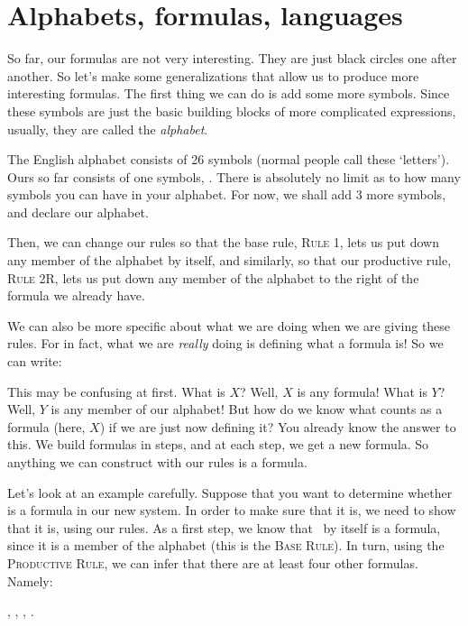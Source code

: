 \section{Alphabets, formulas, languages}

So far, our formulas are not very interesting. They are just black circles one after another. So let's make some generalizations that allow us to produce more interesting formulas. The first thing we can do is add some more symbols. Since these symbols are just the basic building blocks of more complicated expressions, usually, they are called the \textit{alphabet}. 

The English alphabet consists of 26 symbols (normal people call these `letters'). Ours so far consists of one symbols, \bcirc. There is absolutely no limit as to how many symbols you can have in your alphabet. For now, we shall add 3 more symbols, and declare our alphabet.


Then, we can change our rules so that the base rule, \textsc{Rule 1}, lets us put down any member of the alphabet by itself, and similarly, so that our productive rule, \textsc{Rule 2R}, lets us put down any member of the alphabet to the right of the formula we already have. 

We can also be more specific about what we are doing when we are giving these rules. For in fact, what we are \textit{really} doing is defining what a formula is! So we can write:



This may be confusing at first. What is $X$? Well, $X$ is any formula! What is $Y$? Well, $Y$ is any member of our alphabet! But how do we know what counts as a formula (here, $X$) if we are just now defining it? You already know the answer to this. We build formulas in steps, and at each step, we get a new formula. So anything we can construct with our rules is a formula. 

Let's look at an example carefully. Suppose that you want to determine whether \bbox\bcirc\bbox\btri{} is a formula in our new system. In order to make sure that it is, we need to show that it is, using our rules. As a first step, we know that \bbox\ by itself is a formula, since it is a member of the alphabet (this is the \textsc{Base Rule}). In turn, using the \textsc{Productive Rule}, we can infer that there are at least four other formulas. Namely:
\begin{center}
	\bbox\bcirc, \bbox\btri, \bbox\bstar, \bbox\bbox.
\end{center}

